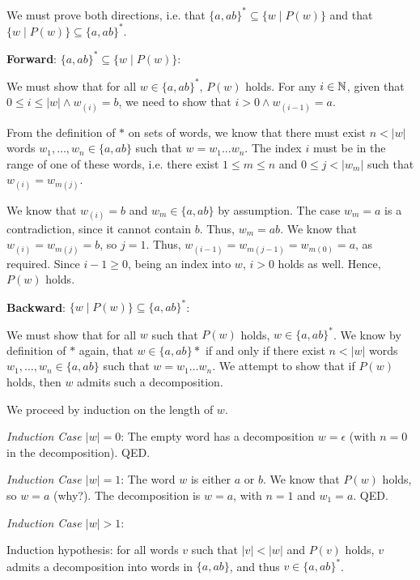 \begin{exercise}{}
\begin{solution}
    We must prove both directions, i.e. that \(\{a,ab\}^* \subseteq \{w \mid
    P(w)\}\) and that \(\{w \mid P(w)\} \subseteq \{a,ab\}^*\).

    \noindent
    \textbf{Forward}: \(\{a,ab\}^* \subseteq \{w \mid P(w)\}\):

    We must show that for all \(w \in \{a,ab\}^*\), \(P(w)\) holds. For any \(i
    \in \mathbb{N}\), given that \(0 \le i \le |w| \land w_{(i)} = b\), we need
    to show that \(i > 0 \land w_{(i - 1)} = a\).
    
    From the definition of \(*\) on sets of words, we know that there must exist
    \(n < |w|\) words \(w_1, \ldots, w_n \in \{a, ab\}\) such that \(w = w_1
    \ldots w_n\). The index \(i\) must be in the range of one of these words,
    i.e. there exist \(1 \leq m \leq n\) and \(0 \leq j < |w_m|\) such that
    \(w_{(i)} = w_{m(j)}\). 

    We know that \(w_{(i)} = b\) and \(w_{m} \in \{a, ab\}\) by assumption. The
    case \(w_m = a\) is a contradiction, since it cannot contain \(b\). Thus,
    \(w_m = ab\). We know that \(w_{(i)} = w_{m(j)} = b\), so \(j = 1\). Thus,
    \(w_{(i - 1)} = w_{m(j - 1)} = w_{m(0)} = a\), as required. Since \(i - 1
    \geq 0\), being an index into \(w\), \(i > 0\) holds as well. Hence,
    \(P(w)\) holds.

    \noindent
    \textbf{Backward}: \(\{w \mid P(w)\} \subseteq \{a,ab\}^*\):

    We must show that for all \(w\) such that \(P(w)\) holds, \(w \in
    \{a,ab\}^*\). We know by definition of \(*\) again, that \(w \in \{a,
    ab\}*\) if and only if there exist \(n < |w|\) words \(w_1, \ldots, w_n \in
    \{a, ab\}\) such that \(w = w_1 \ldots w_n\). We attempt to show that if
    \(P(w)\) holds, then \(w\) admits such a decomposition.

    We proceed by induction on the length of \(w\).

    \noindent
    \textit{Induction Case \(|w| = 0\)}: The empty word has a decomposition \(w =
    \epsilon\) (with \(n = 0\) in the decomposition). QED.

    \noindent
    \textit{Induction Case \(|w| = 1\)}: The word \(w\) is either \(a\) or \(b\). We know
    that \(P(w)\) holds, so \(w = a\) (why?). The decomposition is \(w = a\),
    with \(n = 1\) and \(w_1 = a\). QED.

    \noindent
    \textit{Induction Case \(|w| > 1\)}: 

    Induction hypothesis: for all words \(v\) such that \(|v| < |w|\) and
    \(P(v)\) holds, \(v\) admits a decomposition into words in \(\{a, ab\}\),
    and thus \(v \in \{a, ab\}^*\).


\end{solution}
\end{exercise}

